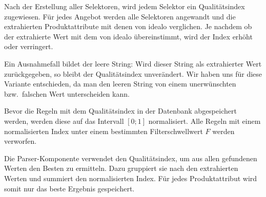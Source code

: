 Nach der Erstellung aller Selektoren, wird jedem Selektor ein Qualitätsindex zugewiesen.
Für jedes Angebot werden alle Selektoren angewandt und die extrahierten Produktattribute mit denen von idealo
verglichen.
Je nachdem ob der extrahierte Wert mit dem von idealo übereinstimmt, wird der Index erhöht oder verringert.

Ein Ausnahmefall bildet der leere String: Wird dieser String als extrahierter Wert zurückgegeben, so bleibt der
Qualitätsindex unverändert.
Wir haben uns für diese Variante entschieden, da man den leeren String von einem unerwünschten bzw.\
falschen Wert unterscheiden kann.

Bevor die Regeln mit dem Qualitätsindex in der Datenbank abgespeichert werden, werden diese auf das Intervall $[0; 1]$
normalisiert.
Alle Regeln mit einem normalisierten Index unter einem bestimmten Filterschwellwert $F$ werden verworfen.

Die Parser-Komponente verwendet den Qualitätsindex, um aus allen gefundenen Werten den Besten zu ermitteln.
Dazu gruppiert sie nach den extrahierten Werten und summiert den normalisierten Index.
Für jedes Produktattribut wird somit nur das beste Ergebnis gespeichert.